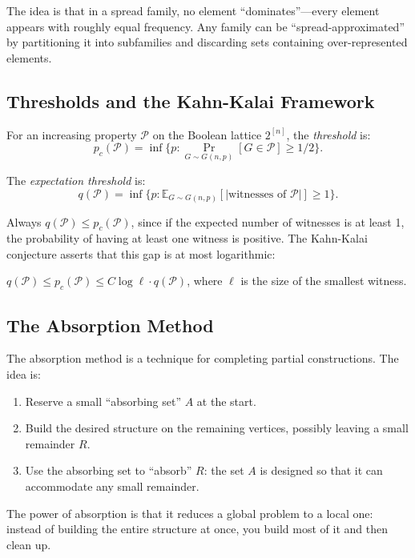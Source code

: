 The idea is that in a spread family, no element ``dominates''---every element appears with roughly equal frequency. Any family can be ``spread-approximated'' by partitioning it into subfamilies and discarding sets containing over-represented elements.

\subsection{Thresholds and the Kahn-Kalai Framework}

For an increasing property $\mathcal{P}$ on the Boolean lattice $2^{[n]}$, the \emph{threshold} is:
\[
p_c(\mathcal{P}) = \inf\{p : \Pr_{G \sim G(n,p)}[G \in \mathcal{P}] \ge 1/2\}.
\]

The \emph{expectation threshold} is:
\[
q(\mathcal{P}) = \inf\{p : \mathbb{E}_{G \sim G(n,p)}[|\text{witnesses of } \mathcal{P}|] \ge 1\}.
\]

Always $q(\mathcal{P}) \le p_c(\mathcal{P})$, since if the expected number of witnesses is at least 1, the probability of having at least one witness is positive. The Kahn-Kalai conjecture asserts that this gap is at most logarithmic:

\begin{fact}
$q(\mathcal{P}) \le p_c(\mathcal{P}) \le C \log \ell \cdot q(\mathcal{P})$, where $\ell$ is the size of the smallest witness.
\end{fact}

\subsection{The Absorption Method}

The absorption method is a technique for completing partial constructions. The idea is:

\begin{enumerate}
\item Reserve a small ``absorbing set'' $A$ at the start.
\item Build the desired structure on the remaining vertices, possibly leaving a small remainder $R$.
\item Use the absorbing set to ``absorb'' $R$: the set $A$ is designed so that it can accommodate any small remainder.
\end{enumerate}

The power of absorption is that it reduces a global problem to a local one: instead of building the entire structure at once, you build most of it and then clean up.

